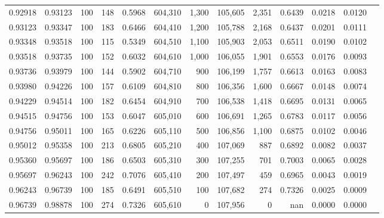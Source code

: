 \begin{tabular}{rrrrrrrrrrrrr}
0.92918 & 0.93123 &   100 & 148 &                                     0.5968 & 604,310 &   1,300 & 105,605 &   2,351 & 0.6439 & 0.0218 & 0.0120 \\
0.93123 & 0.93347 &   100 & 183 &                                     0.6466 & 604,410 &   1,200 & 105,788 &   2,168 & 0.6437 & 0.0201 & 0.0111 \\
0.93348 & 0.93518 &   100 & 115 &                                     0.5349 & 604,510 &   1,100 & 105,903 &   2,053 & 0.6511 & 0.0190 & 0.0102 \\
0.93518 & 0.93735 &   100 & 152 &                                     0.6032 & 604,610 &   1,000 & 106,055 &   1,901 & 0.6553 & 0.0176 & 0.0093 \\
0.93736 & 0.93979 &   100 & 144 &                                     0.5902 & 604,710 &     900 & 106,199 &   1,757 & 0.6613 & 0.0163 & 0.0083 \\
0.93980 & 0.94226 &   100 & 157 &                                     0.6109 & 604,810 &     800 & 106,356 &   1,600 & 0.6667 & 0.0148 & 0.0074 \\
0.94229 & 0.94514 &   100 & 182 &                                     0.6454 & 604,910 &     700 & 106,538 &   1,418 & 0.6695 & 0.0131 & 0.0065 \\
0.94515 & 0.94756 &   100 & 153 &                                     0.6047 & 605,010 &     600 & 106,691 &   1,265 & 0.6783 & 0.0117 & 0.0056 \\
0.94756 & 0.95011 &   100 & 165 &                                     0.6226 & 605,110 &     500 & 106,856 &   1,100 & 0.6875 & 0.0102 & 0.0046 \\
0.95012 & 0.95358 &   100 & 213 &                                     0.6805 & 605,210 &     400 & 107,069 &     887 & 0.6892 & 0.0082 & 0.0037 \\
0.95360 & 0.95697 &   100 & 186 &                                     0.6503 & 605,310 &     300 & 107,255 &     701 & 0.7003 & 0.0065 & 0.0028 \\
0.95697 & 0.96243 &   100 & 242 &                                     0.7076 & 605,410 &     200 & 107,497 &     459 & 0.6965 & 0.0043 & 0.0019 \\
0.96243 & 0.96739 &   100 & 185 &                                     0.6491 & 605,510 &     100 & 107,682 &     274 & 0.7326 & 0.0025 & 0.0009 \\
0.96739 & 0.98878 &   100 & 274 &                                     0.7326 & 605,610 &       0 & 107,956 &       0 &    nan & 0.0000 & 0.0000 \\
\bottomrule
\end{tabular}
